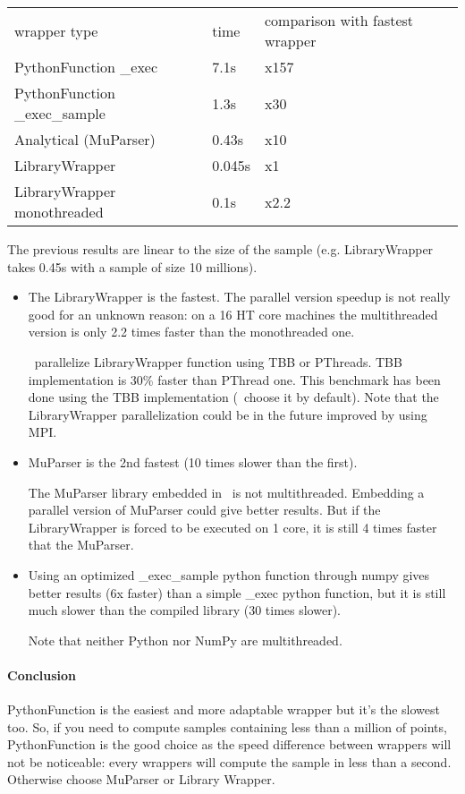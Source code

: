 \begin{tabular}{lll}
  wrapper type & time & comparison with fastest wrapper \\
  PythonFunction \_exec & 7.1s & x157 \\
  PythonFunction \_exec\_sample & 1.3s & x30 \\
  Analytical (MuParser) & 0.43s & x10 \\
  LibraryWrapper & 0.045s & x1 \\
  LibraryWrapper monothreaded & 0.1s & x2.2 \\
\end{tabular}

The previous results are linear to the size of the sample (e.g. LibraryWrapper takes 0.45s with a sample of size 10 millions).

\begin{itemize}
\item The LibraryWrapper is the fastest. The parallel version speedup is not really good for an unknown reason: on a 16 HT core machines the multithreaded version is only 2.2 times faster than the monothreaded one.

  \OT\ parallelize LibraryWrapper function using TBB or PThreads. TBB implementation is 30\% faster than PThread one. This benchmark has been done using the TBB implementation (\OT\ choose it by default). Note that the LibraryWrapper parallelization could be in the future improved by using MPI.

\item MuParser is the 2nd fastest (10 times slower than the first).

  The MuParser library embedded in \OT\ is not multithreaded. Embedding a parallel version of MuParser could give better results. But if the LibraryWrapper is forced to be executed on 1 core, it is still 4 times faster that the MuParser.
\item Using an optimized \_exec\_sample python function through numpy gives better results (6x faster) than a simple \_exec python function, but it is still much slower than the compiled library (30 times slower).

  Note that neither Python nor NumPy are multithreaded.
\end{itemize}


\paragraph{Conclusion} PythonFunction is the easiest and more adaptable wrapper but it's the slowest too. So, if you need to compute samples containing less than a million of points, PythonFunction is the good choice as the speed difference between wrappers will not be noticeable: every wrappers will compute the sample in less than a second. Otherwise choose MuParser or Library Wrapper.




